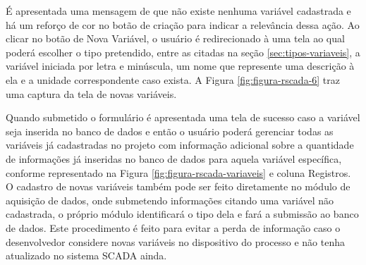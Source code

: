 É apresentada uma mensagem de que não existe nenhuma variável cadastrada e há um reforço de cor no botão de criação para indicar a relevância dessa ação. Ao clicar no botão de Nova Variável, o usuário é redirecionado à uma tela ao qual poderá escolher o tipo pretendido, entre as citadas na seção \ref{sec:tipos-variaveis}, a variável iniciada por letra e minúscula, um nome que represente uma descrição à ela e a unidade correspondente caso exista. A Figura \ref{fig:figura-rscada-6} traz uma captura da tela de novas variáveis.

        \begin{figure}[!h]
    	\end{figure}
    	
Quando submetido o formulário é apresentada uma tela de sucesso caso a variável seja inserida no banco de dados e então o usuário poderá gerenciar todas as variáveis já cadastradas no projeto com informação adicional sobre a quantidade de informações já inseridas no banco de dados para aquela variável específica, conforme representado na Figura \ref{fig:figura-rscada-variaveis} e coluna Registros. O cadastro de novas variáveis também pode ser feito diretamente no módulo de aquisição de dados, onde submetendo informações citando uma variável não cadastrada, o próprio módulo identificará o tipo dela e fará a submissão ao banco de dados. Este procedimento é feito para evitar a perda de informação caso o desenvolvedor considere novas variáveis no dispositivo do processo e não tenha atualizado no sistema \gls{SCADA} ainda.

        \begin{figure}[!h]
    	\end{figure}

